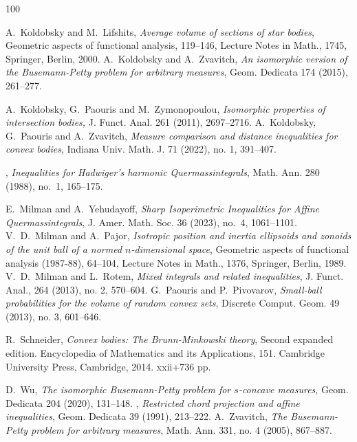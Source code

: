 \documentclass[11pt,leqno]{article}
\theoremstyle{definition}
\theoremstyle{remark}
\numberwithin{equation}{section}
\newcommand{\1}{\textbf{1}}
\begin{document}
\begin{thebibliography}{100}

 {\rm A.\ Koldobsky and M.\ Lifshits}, \textit{Average volume
of sections of star bodies}, Geometric aspects of functional analysis, 119--146,
Lecture Notes in Math., 1745, Springer, Berlin, 2000.
  A.~Koldobsky and A.~Zvavitch,  \textit{An isomorphic version of the Busemann-Petty problem for arbitrary measures},
Geom. Dedicata 174 (2015), 261--277.


 A.~Koldobsky, G.~Paouris and M.~Zymonopoulou,
\textit{Isomorphic properties of intersection bodies,} J. Funct. Anal. 261 (2011), 2697--2716.
 {\rm A.~Koldobsky, G.~Paouris and A.~Zvavitch}, {\sl Measure comparison and distance
inequalities for convex bodies}, Indiana Univ. Math. J. {71} (2022), no. 1, 391--407.

, {\sl Inequalities for Hadwiger's
harmonic Quermassintegrals}, Math. Ann. 280 (1988), no.~1, 165--175.

 {\rm E.\ Milman and A.\ Yehudayoff}, {\sl Sharp Isoperimetric
Inequalities for Affine Quermassintegrals},  J. Amer. Math. Soc. 36 (2023), no.~4, 1061--1101.
 {\rm V.~D.~Milman and A.~Pajor}, {\sl Isotropic position
and inertia ellipsoids and zonoids of the unit ball of a normed $n$-dimensional space}, Geometric aspects of functional 
analysis (1987-88), 64--104, Lecture Notes in Math., 1376, Springer, Berlin, 1989.
 {\rm V.~D.~Milman and L.~Rotem}, \textit{Mixed integrals and related inequalities}, J. Funct. Anal.,
{264} (2013), no. 2, 570--604.
\textrm{G.\ Paouris and P.\ Pivovarov}, {\sl Small-ball probabilities for the volume of random convex sets}, Discrete Comput.
Geom. {49} (2013), no. 3, 601--646.

 {R.~Schneider},  \textit{Convex bodies: The Brunn-Minkowski
theory}, Second expanded edition. Encyclopedia of Mathematics and its Applications, 151.
Cambridge University Press, Cambridge, 2014. xxii+736 pp.

 {\rm D.~Wu}, \textit{The isomorphic Busemann-Petty problem for $s$-concave measures},
Geom. Dedicata 204 (2020), 131--148.
, {\sl Restricted chord projection and affine
inequalities}, Geom. Dedicata {39} (1991), 213--222.
 A.~Zvavitch, \textit{The Busemann-Petty problem for arbitrary
measures}, Math. Ann. {331}, no. 4 (2005), 867--887.



\end{thebibliography}
\end{document}

